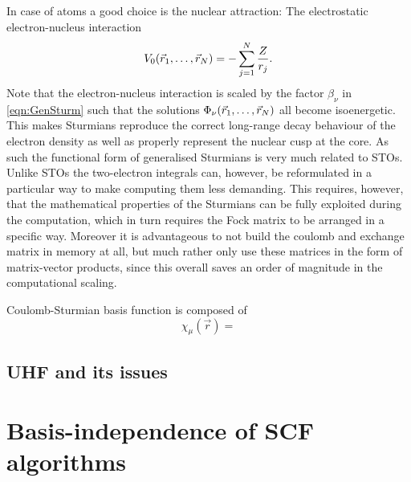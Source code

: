 In case of atoms a good choice is the nuclear attraction:
The electrostatic electron-nucleus interaction
\[
	V_0(\vec{r}_1, \ldots, \vec{r}_N) = - \sum_{j=1}^N \frac{Z}{r_j}.
\]
Note that the electron-nucleus interaction is scaled by the factor $\beta_\nu$ in \eqref{eqn:GenSturm}
such that the solutions $\Phi_\nu(\vec{r}_1, \ldots, \vec{r}_N)$ all become isoenergetic.
This makes Sturmians reproduce the correct long-range decay behaviour of the electron density
as well as properly represent the nuclear cusp at the core.
As such the functional form of generalised Sturmians is very much related to STOs.
Unlike STOs the two-electron integrals can, however, be reformulated in a particular way
to make computing them less demanding.
This requires, however, that the mathematical properties of the Sturmians
can be fully exploited during the computation,
which in turn requires the Fock matrix to be arranged in a specific way.
Moreover it is advantageous to not build the coulomb and exchange matrix in memory at all,
but much rather only use these matrices in the form of matrix-vector products,
since this overall saves an order of magnitude in the computational scaling.


Coulomb-Sturmian basis function is composed of
\[ \chi_\mu(\vec{r}) = \]



\subsection{UHF and its issues}


\section{Basis-independence of SCF algorithms}
